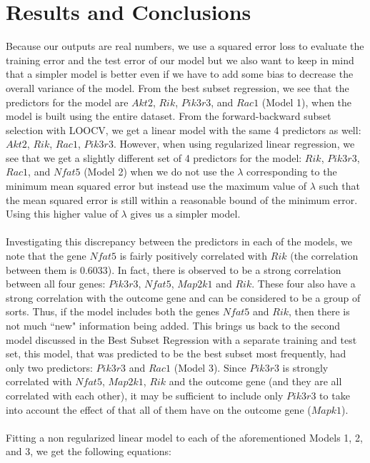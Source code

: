 \documentclass{article}
\begin{document}
\section{Results and Conclusions}
Because our outputs are real numbers, we use a squared error loss to evaluate the training error and the test error of our model but we also want to keep in mind that a simpler model is better even if we have to add some bias to decrease the overall variance of the model.  From the best subset regression, we see that the predictors for the model are $Akt2$, $Rik$, $Pik3r3$, and $Rac1$ (Model 1), when the model is built using the entire dataset. From the forward-backward subset selection with LOOCV, we get a linear model with the same 4 predictors as well: $Akt2$, $Rik$, $Rac1$, $Pik3r3$.  However, when using regularized linear regression, we see that we get a slightly different set of 4 predictors for the model: $Rik$, $Pik3r3$, $Rac1$, and $Nfat5$ (Model 2) when we do not use the $\lambda$ corresponding to the minimum mean squared error but instead use the maximum value of $\lambda$ such that the mean squared error is still within a reasonable bound of the minimum error.  Using this higher value of $\lambda$ gives us a simpler model. \\
\null\\
Investigating this discrepancy between the predictors in each of the models, we note that the gene $Nfat5$ is fairly positively correlated with $Rik$ (the correlation between them is 0.6033). In fact, there is observed to be a strong correlation between all four genes: $Pik3r3$, $Nfat5$, $Map2k1$ and $Rik$. These four also have a strong correlation with the outcome gene and can be considered to be a group of sorts. Thus, if the model includes both the genes $Nfat5$ and $Rik$, then there is not much ``new" information being added. This brings us back to the second model discussed in the Best Subset Regression with a separate training and test set, this model, that was predicted to be the best subset most frequently, had only two predictors: $Pik3r3$ and $Rac1$ (Model 3). Since $Pik3r3$ is strongly correlated with $Nfat5$, $Map2k1$, $Rik$ and the outcome gene (and they are all correlated with each other), it may be sufficient to include only $Pik3r3$ to take into account the effect of that all of them have on the outcome gene ($Mapk1$).  \\
\null\\
Fitting a non regularized linear model to each of the aforementioned Models 1, 2, and 3, we get the following equations:
\end{document}
